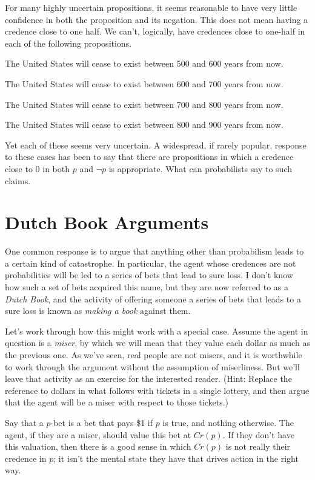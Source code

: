 For many highly uncertain propositions, it seems reasonable to have very little confidence in both the proposition and its negation. This does not mean having a credence close to one half. We can't, logically, have credences close to one-half in each of the following propositions.

\begin{itemize*}
\item The United States will cease to exist between 500 and 600 years from now.
\item The United States will cease to exist between 600 and 700 years from now.
\item The United States will cease to exist between 700 and 800 years from now.
\item The United States will cease to exist between 800 and 900 years from now.
\end{itemize*}
Yet each of these seems very uncertain. A widespread, if rarely popular, response to these cases has been to say that there are propositions in which a credence close to 0 in both $p$ and $\neg p$ is appropriate. What can probabilists say to such claims.

\section{Dutch Book Arguments}
One common response is to argue that anything other than probabilism leads to a certain kind of catastrophe. In particular, the agent whose credences are not probabilities will be led to a series of bets that lead to sure loss. I don't know how such a set of bets acquired this name, but they are now referred to as a \textit{Dutch Book}, and the activity of offering someone a series of bets that leads to a sure loss is known as \textit{making a book} against them.

Let's work through how this might work with a special case. Assume the agent in question is a \textit{miser}, by which we will mean that they value each dollar as much as the previous one. As we've seen, real people are not misers, and it is worthwhile to work through the argument without the assumption of miserliness. But we'll leave that activity as an exercise for the interested reader. (Hint: Replace the reference to dollars in what follows with tickets in a single lottery, and then argue that the agent will be a miser with respect to those tickets.)

Say that a $p$-bet is a bet that pays \$1 if $p$ is true, and nothing otherwise. The agent, if they are a miser, should value this bet at $Cr(p)$. If they don't have this valuation, then there is a good sense in which $Cr(p)$ is not really their credence in $p$; it isn't the mental state they have that drives action in the right way.

